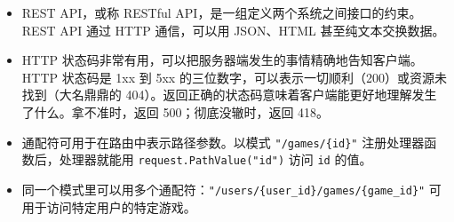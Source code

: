 \begin{itemize}
\item REST API，或称 RESTful API，是一组定义两个系统之间接口的约束。REST API 通过 HTTP 通信，可以用 JSON、HTML 甚至纯文本交换数据。
\item HTTP 状态码非常有用，可以把服务器端发生的事情精确地告知客户端。HTTP 状态码是 1xx 到 5xx 的三位数字，可以表示一切顺利（200）或资源未找到（大名鼎鼎的 404）。返回正确的状态码意味着客户端能更好地理解发生了什么。拿不准时，返回 500；彻底没辙时，返回 418。
\item 通配符可用于在路由中表示路径参数。以模式 \texttt{"/games/\{id\}"} 注册处理器函数后，处理器就能用 \texttt{request.PathValue("id")} 访问 \texttt{id} 的值。
\item 同一个模式里可以用多个通配符：\texttt{"/users/\{user\_id\}/games/\{game\_id\}"} 可用于访问特定用户的特定游戏。
\end{itemize}

